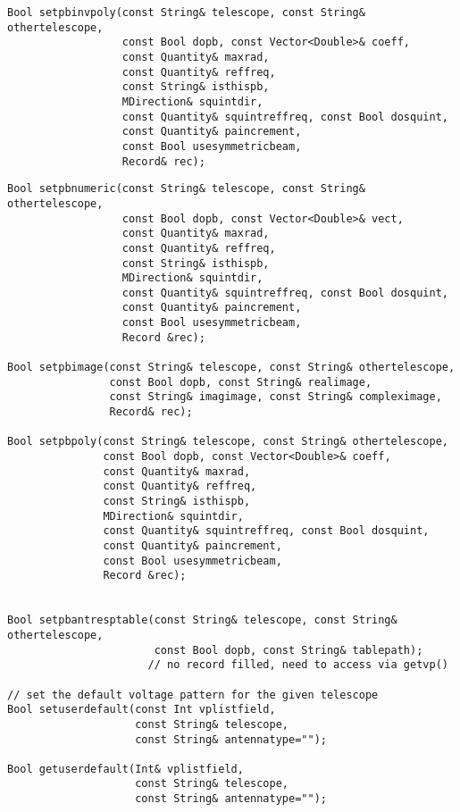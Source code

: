 \documentclass[12pt]{article}
\begin{document}
{\begin{verbatim}
Bool setpbinvpoly(const String& telescope, const String& othertelescope,
                  const Bool dopb, const Vector<Double>& coeff,
                  const Quantity& maxrad,
                  const Quantity& reffreq,
                  const String& isthispb,
                  MDirection& squintdir,
                  const Quantity& squintreffreq, const Bool dosquint,
                  const Quantity& paincrement,
                  const Bool usesymmetricbeam,
                  Record& rec);
\end{verbatim}

\begin{verbatim}
Bool setpbnumeric(const String& telescope, const String& othertelescope,
                  const Bool dopb, const Vector<Double>& vect,
                  const Quantity& maxrad,
                  const Quantity& reffreq,
                  const String& isthispb,
                  MDirection& squintdir,
                  const Quantity& squintreffreq, const Bool dosquint,
                  const Quantity& paincrement,
                  const Bool usesymmetricbeam,
                  Record &rec);

Bool setpbimage(const String& telescope, const String& othertelescope, 
                const Bool dopb, const String& realimage, 
                const String& imagimage, const String& compleximage, 
                Record& rec);

Bool setpbpoly(const String& telescope, const String& othertelescope,
               const Bool dopb, const Vector<Double>& coeff,
               const Quantity& maxrad,
               const Quantity& reffreq,
               const String& isthispb,
               MDirection& squintdir,
               const Quantity& squintreffreq, const Bool dosquint,
               const Quantity& paincrement,
               const Bool usesymmetricbeam,
               Record &rec);


Bool setpbantresptable(const String& telescope, const String& othertelescope,
                       const Bool dopb, const String& tablepath);
                      // no record filled, need to access via getvp()

// set the default voltage pattern for the given telescope
Bool setuserdefault(const Int vplistfield,
                    const String& telescope,
                    const String& antennatype="");

Bool getuserdefault(Int& vplistfield,
                    const String& telescope,
                    const String& antennatype="");


\end{verbatim}}
\end{document}
